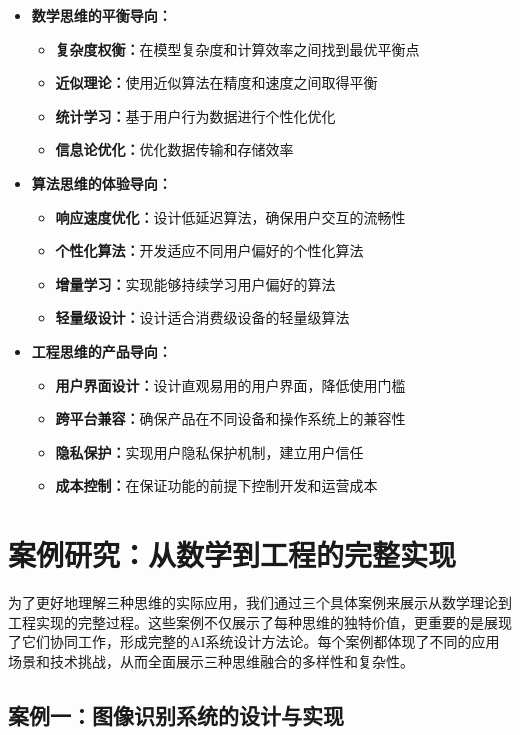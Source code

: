 \begin{itemize}
\item \textbf{数学思维的平衡导向：}
\begin{itemize}
\item \textbf{复杂度权衡：}在模型复杂度和计算效率之间找到最优平衡点
\item \textbf{近似理论：}使用近似算法在精度和速度之间取得平衡
\item \textbf{统计学习：}基于用户行为数据进行个性化优化
\item \textbf{信息论优化：}优化数据传输和存储效率
\end{itemize}

\item \textbf{算法思维的体验导向：}
\begin{itemize}
\item \textbf{响应速度优化：}设计低延迟算法，确保用户交互的流畅性
\item \textbf{个性化算法：}开发适应不同用户偏好的个性化算法
\item \textbf{增量学习：}实现能够持续学习用户偏好的算法
\item \textbf{轻量级设计：}设计适合消费级设备的轻量级算法
\end{itemize}

\item \textbf{工程思维的产品导向：}
\begin{itemize}
\item \textbf{用户界面设计：}设计直观易用的用户界面，降低使用门槛
\item \textbf{跨平台兼容：}确保产品在不同设备和操作系统上的兼容性
\item \textbf{隐私保护：}实现用户隐私保护机制，建立用户信任
\item \textbf{成本控制：}在保证功能的前提下控制开发和运营成本
\end{itemize}
\end{itemize}

\section{案例研究：从数学到工程的完整实现}

为了更好地理解三种思维的实际应用，我们通过三个具体案例来展示从数学理论到工程实现的完整过程。这些案例不仅展示了每种思维的独特价值，更重要的是展现了它们协同工作，形成完整的AI系统设计方法论。每个案例都体现了不同的应用场景和技术挑战，从而全面展示三种思维融合的多样性和复杂性。

\subsection{案例一：图像识别系统的设计与实现}

